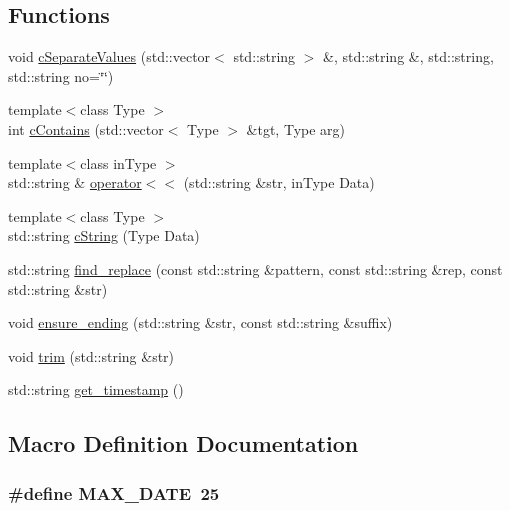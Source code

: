 \subsection*{Functions}
\begin{DoxyCompactItemize}
\item 
void \hyperlink{utilities_8hh_a2f854ac6ac93c0790fd5a5c0b9715a74}{c\+Separate\+Values} (std\+::vector$<$ std\+::string $>$ \&, std\+::string \&, std\+::string, std\+::string no=\char`\"{}\char`\"{})
\item 
{\footnotesize template$<$class Type $>$ }\\int \hyperlink{utilities_8hh_ac50055ad10ac4af6192feb9ea7fa5e00}{c\+Contains} (std\+::vector$<$ Type $>$ \&tgt, Type arg)
\item 
{\footnotesize template$<$class in\+Type $>$ }\\std\+::string \& \hyperlink{utilities_8hh_a0f99b3edfdcfe1466f26eea911b4c7d0}{operator$<$$<$} (std\+::string \&str, in\+Type Data)
\item 
{\footnotesize template$<$class Type $>$ }\\std\+::string \hyperlink{utilities_8hh_af0192c9d10463d2686dc99fde19913e6}{c\+String} (Type Data)
\item 
std\+::string \hyperlink{utilities_8hh_a2a1d823bc6c237b6c1dfccfe9f781394}{find\+\_\+replace} (const std\+::string \&pattern, const std\+::string \&rep, const std\+::string \&str)
\item 
void \hyperlink{utilities_8hh_a5bcdfdc95f2e3d46749414d783bc6d42}{ensure\+\_\+ending} (std\+::string \&str, const std\+::string \&suffix)
\item 
void \hyperlink{utilities_8hh_a83375b89f8b135c348ba5bea0c847da0}{trim} (std\+::string \&str)
\item 
std\+::string \hyperlink{utilities_8hh_a3f3b864aa1926634aeab0d037cefc11d}{get\+\_\+timestamp} ()
\end{DoxyCompactItemize}


\subsection{Macro Definition Documentation}
\subsubsection[{\texorpdfstring{M\+A\+X\+\_\+\+D\+A\+TE}{MAX_DATE}}]{\setlength{\rightskip}{0pt plus 5cm}\#define M\+A\+X\+\_\+\+D\+A\+TE~25}\hypertarget{utilities_8hh_ab2854f198e119d1843f14002a2621aa7}{}\label{utilities_8hh_ab2854f198e119d1843f14002a2621aa7}


